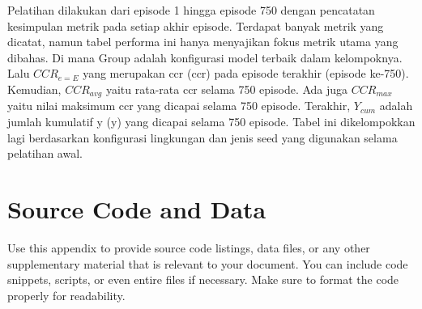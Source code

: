 Pelatihan dilakukan dari episode 1 hingga episode 750 dengan pencatatan kesimpulan metrik pada setiap akhir episode.
Terdapat banyak metrik yang dicatat, namun tabel performa ini hanya menyajikan fokus metrik utama yang dibahas.
Di mana Group adalah konfigurasi model terbaik dalam kelompoknya.
Lalu $CCR_{e=E}$ yang merupakan \acrlong{ccr} (\acrshort{ccr}) pada episode terakhir (episode ke-750).
Kemudian, $CCR_{avg}$ yaitu rata-rata \acrshort{ccr} selama 750 episode.
Ada juga $CCR_{max}$ yaitu nilai maksimum \acrshort{ccr} yang dicapai selama 750 episode.
Terakhir, $Y_{cum}$ adalah jumlah kumulatif \acrlong{y} (\acrshort{y}) yang dicapai selama 750 episode.
Tabel ini dikelompokkan lagi berdasarkan konfigurasi lingkungan dan jenis seed yang digunakan selama pelatihan awal.


\section{Source Code and Data}\label{apx:source_code_and_data}
Use this appendix to provide source code listings, data files, or any other supplementary material that is relevant to your document. 
You can include code snippets, scripts, or even entire files if necessary. 
Make sure to format the code properly for readability.